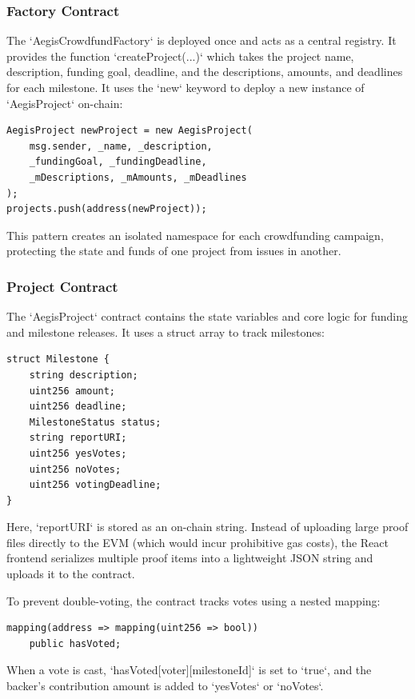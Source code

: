 \documentclass[conference]{IEEEtran}
\begin{document}
\subsubsection{Factory Contract}
The `AegisCrowdfundFactory` is deployed once and acts as a central registry. It provides the function `createProject(...)` which takes the project name, description, funding goal, deadline, and the descriptions, amounts, and deadlines for each milestone. It uses the `new` keyword to deploy a new instance of `AegisProject` on-chain:
\begin{verbatim}
AegisProject newProject = new AegisProject(
    msg.sender, _name, _description,
    _fundingGoal, _fundingDeadline,
    _mDescriptions, _mAmounts, _mDeadlines
);
projects.push(address(newProject));
\end{verbatim}
This pattern creates an isolated namespace for each crowdfunding campaign, protecting the state and funds of one project from issues in another.

\subsubsection{Project Contract}
The `AegisProject` contract contains the state variables and core logic for funding and milestone releases. It uses a struct array to track milestones:
\begin{verbatim}
struct Milestone {
    string description;
    uint256 amount;
    uint256 deadline;
    MilestoneStatus status;
    string reportURI;
    uint256 yesVotes;
    uint256 noVotes;
    uint256 votingDeadline;
}
\end{verbatim}
Here, `reportURI` is stored as an on-chain string. Instead of uploading large proof files directly to the EVM (which would incur prohibitive gas costs), the React frontend serializes multiple proof items into a lightweight JSON string and uploads it to the contract.

To prevent double-voting, the contract tracks votes using a nested mapping:
\begin{verbatim}
mapping(address => mapping(uint256 => bool)) 
    public hasVoted;
\end{verbatim}
When a vote is cast, `hasVoted[voter][milestoneId]` is set to `true`, and the backer's contribution amount is added to `yesVotes` or `noVotes`.
\end{document}
